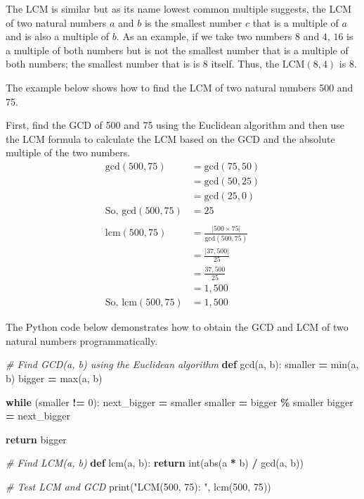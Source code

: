 \documentclass[
]{book}
\newenvironment{Shaded}{\begin{snugshade}}{\end{snugshade}}
\newcommand{\BuiltInTok}[1]{#1}
\newcommand{\CommentTok}[1]{\textcolor[rgb]{0.56,0.35,0.01}{\textit{#1}}}
\newcommand{\ControlFlowTok}[1]{\textcolor[rgb]{0.13,0.29,0.53}{\textbf{#1}}}
\newcommand{\DecValTok}[1]{\textcolor[rgb]{0.00,0.00,0.81}{#1}}
\newcommand{\KeywordTok}[1]{\textcolor[rgb]{0.13,0.29,0.53}{\textbf{#1}}}
\newcommand{\NormalTok}[1]{#1}
\newcommand{\OperatorTok}[1]{\textcolor[rgb]{0.81,0.36,0.00}{\textbf{#1}}}
\newcommand{\StringTok}[1]{\textcolor[rgb]{0.31,0.60,0.02}{#1}}
\begin{document}
The LCM is similar but as its name lowest common multiple suggests, the LCM of two natural numbers \(a\) and \(b\) is the smallest number \(c\) that is a multiple of \(a\) and is also a multiple of \(b\). As an example, if we take two numbers \(8\) and \(4\), \(16\) is a multiple of both numbers but is not the smallest number that is a multiple of both numbers; the smallest number that is is \(8\) itself. Thus, the \(\text{LCM}(8, 4)\) is \(8\).

The example below shows how to find the LCM of two natural numbers 500 and 75.

First, find the GCD of 500 and 75 using the Euclidean algorithm and then use the LCM formula to calculate the LCM based on the GCD and the absolute multiple of the two numbers.
\[
\begin{aligned}
\text{gcd}(500, 75) &= \text{gcd}(75, 50) \\
&= \text{gcd}(50, 25) \\
&= \text{gcd}(25, 0) \\
\text{So, gcd}(500, 75) &= 25 \\
 \\
\text{lcm}(500, 75) &= \frac{\lvert 500 \times 75 \rvert}{\text{gcd}(500, 75)} \\
&= \frac{\lvert 37,500 \rvert}{25} \\
&= \frac{37,500}{25} \\
&= 1,500 \\
\text{So, lcm}(500, 75) &= 1,500
\end{aligned}
\]

The Python code below demonstrates how to obtain the GCD and LCM of two natural numbers programmatically.

\begin{Shaded}
\begin{Highlighting}[]
\CommentTok{\# Find GCD(a, b) using the Euclidean algorithm}
\KeywordTok{def}\NormalTok{ gcd(a, b):}
\NormalTok{    smaller }\OperatorTok{=} \BuiltInTok{min}\NormalTok{(a, b)}
\NormalTok{    bigger }\OperatorTok{=} \BuiltInTok{max}\NormalTok{(a, b)}

    \ControlFlowTok{while}\NormalTok{ (smaller }\OperatorTok{!=} \DecValTok{0}\NormalTok{):}
\NormalTok{        next\_bigger }\OperatorTok{=}\NormalTok{ smaller}
\NormalTok{        smaller }\OperatorTok{=}\NormalTok{ bigger }\OperatorTok{\%}\NormalTok{ smaller}
\NormalTok{        bigger }\OperatorTok{=}\NormalTok{ next\_bigger}

    \ControlFlowTok{return}\NormalTok{ bigger}

\CommentTok{\# Find LCM(a, b)}
\KeywordTok{def}\NormalTok{ lcm(a, b):}
    \ControlFlowTok{return} \BuiltInTok{int}\NormalTok{(}\BuiltInTok{abs}\NormalTok{(a }\OperatorTok{*}\NormalTok{ b) }\OperatorTok{/}\NormalTok{ gcd(a, b))}

\CommentTok{\# Test LCM and GCD}
\BuiltInTok{print}\NormalTok{(}\StringTok{"LCM(500, 75): "}\NormalTok{, lcm(}\DecValTok{500}\NormalTok{, }\DecValTok{75}\NormalTok{))}
\end{Highlighting}
\end{Shaded}
\end{document}
